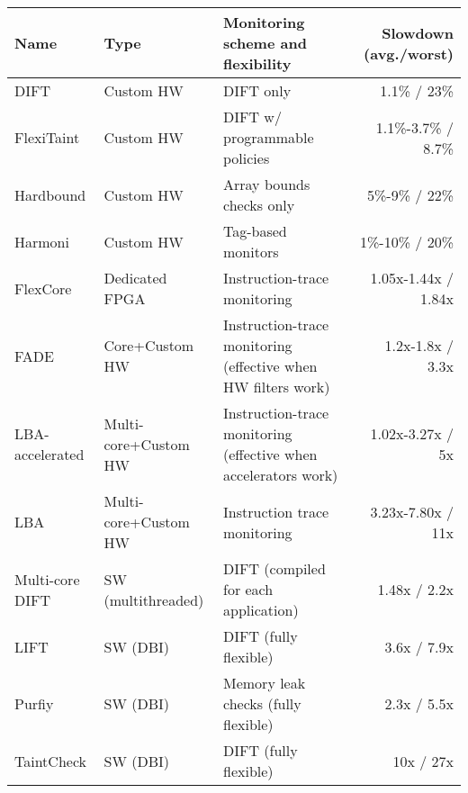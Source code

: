 \begin{tabular}{|l|l|l|r|}

\hline
{\bf Name} & {\bf Type} & {\bf Monitoring scheme and flexibility} & {\bf Slowdown (avg./worst)} \\ \hline\hline

DIFT \cite{dift-asplos04} & Custom HW & DIFT only & 1.1\% / 23\% \\ \hline
FlexiTaint \cite{flexitaint-hpca08} & Custom HW & DIFT w/ programmable policies & 1.1\%-3.7\% / 8.7\% \\ \hline
Hardbound \cite{hardbound-asplos08} & Custom HW & Array bounds checks only & 5\%-9\% / 22\% \\ \hline
Harmoni \cite{harmoni-dsn12} & Custom HW & Tag-based monitors & 1\%-10\% / 20\% \\ \hline\hline

FlexCore \cite{flexcore-micro10} & Dedicated FPGA & Instruction-trace monitoring & 1.05x-1.44x / 1.84x \\ \hline
FADE \cite{fade-hpca14} & Core+Custom HW & Instruction-trace monitoring (effective when HW filters work) & 1.2x-1.8x / 3.3x \\ \hline
LBA-accelerated \cite{lba-isca08} & Multi-core+Custom HW & Instruction-trace monitoring (effective when accelerators work) & 1.02x-3.27x / 5x \\ \hline
LBA \cite{lba-asid06} & Multi-core+Custom HW & Instruction trace monitoring & 3.23x-7.80x / 11x \\ \hline \hline

Multi-core DIFT \cite{nagarajan-interact08} & SW (multithreaded) & DIFT (compiled for each application) & 1.48x / 2.2x \\ \hline

LIFT \cite{lift-micro06} & SW (DBI) & DIFT (fully flexible) & 3.6x / 7.9x \\ \hline
Purfiy \cite{purify-usenix92} & SW (DBI) & Memory leak checks (fully flexible) & 2.3x / 5.5x \\ \hline
TaintCheck \cite{taintcheck-ndsss05} & SW (DBI) & DIFT (fully flexible) & 10x / 27x \\ \hline


\end{tabular}

